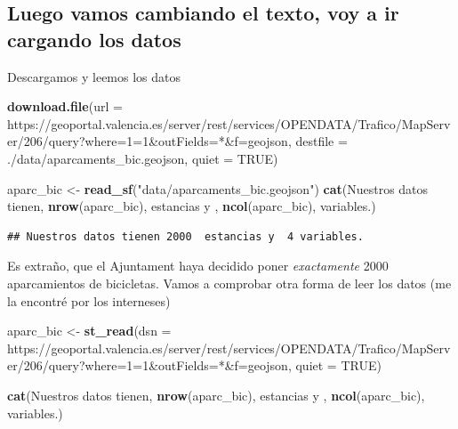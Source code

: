 \documentclass[notspecified,article,submit,moreauthors,pdftex]{Definitions/mdpi}
\newenvironment{Shaded}{\begin{snugshade}}{\end{snugshade}}
\newcommand{\AttributeTok}[1]{\textcolor[rgb]{0.13,0.29,0.53}{#1}}
\newcommand{\ConstantTok}[1]{\textcolor[rgb]{0.56,0.35,0.01}{#1}}
\newcommand{\FunctionTok}[1]{\textcolor[rgb]{0.13,0.29,0.53}{\textbf{#1}}}
\newcommand{\NormalTok}[1]{#1}
\newcommand{\OtherTok}[1]{\textcolor[rgb]{0.56,0.35,0.01}{#1}}
\newcommand{\StringTok}[1]{\textcolor[rgb]{0.31,0.60,0.02}{#1}}
\begin{document}
\subsection{Luego vamos cambiando el texto, voy a ir cargando los
datos}\label{luego-vamos-cambiando-el-texto-voy-a-ir-cargando-los-datos}

Descargamos y leemos los datos

\begin{Shaded}
\begin{Highlighting}[]
\FunctionTok{download.file}\NormalTok{(}\AttributeTok{url =} \StringTok{\textquotesingle{}https://geoportal.valencia.es/server/rest/services/OPENDATA/Trafico/MapServer/206/query?where=1=1\&outFields=*\&f=geojson\textquotesingle{}}\NormalTok{, }\AttributeTok{destfile =} \StringTok{\textquotesingle{}./data/aparcaments\_bic.geojson\textquotesingle{}}\NormalTok{, }\AttributeTok{quiet =} \ConstantTok{TRUE}\NormalTok{)}

\NormalTok{aparc\_bic }\OtherTok{\textless{}{-}} \FunctionTok{read\_sf}\NormalTok{(}\StringTok{"data/aparcaments\_bic.geojson"}\NormalTok{)}
\FunctionTok{cat}\NormalTok{(}\StringTok{\textquotesingle{}Nuestros datos tienen\textquotesingle{}}\NormalTok{, }\FunctionTok{nrow}\NormalTok{(aparc\_bic), }\StringTok{\textquotesingle{} estancias y \textquotesingle{}}\NormalTok{, }\FunctionTok{ncol}\NormalTok{(aparc\_bic), }\StringTok{\textquotesingle{}variables.\textquotesingle{}}\NormalTok{)}
\end{Highlighting}
\end{Shaded}

\begin{verbatim}
## Nuestros datos tienen 2000  estancias y  4 variables.
\end{verbatim}

Es extraño, que el Ajuntament haya decidido poner \emph{exactamente}
2000 aparcamientos de bicicletas. Vamos a comprobar otra forma de leer
los datos (me la encontré por los interneses)

\begin{Shaded}
\begin{Highlighting}[]
\NormalTok{aparc\_bic }\OtherTok{\textless{}{-}} \FunctionTok{st\_read}\NormalTok{(}\AttributeTok{dsn =} \StringTok{\textquotesingle{}https://geoportal.valencia.es/server/rest/services/OPENDATA/Trafico/MapServer/206/query?where=1=1\&outFields=*\&f=geojson\textquotesingle{}}\NormalTok{, }\AttributeTok{quiet =} \ConstantTok{TRUE}\NormalTok{)}

\FunctionTok{cat}\NormalTok{(}\StringTok{\textquotesingle{}Nuestros datos tienen\textquotesingle{}}\NormalTok{, }\FunctionTok{nrow}\NormalTok{(aparc\_bic), }\StringTok{\textquotesingle{} estancias y \textquotesingle{}}\NormalTok{, }\FunctionTok{ncol}\NormalTok{(aparc\_bic), }\StringTok{\textquotesingle{}variables.\textquotesingle{}}\NormalTok{)}
\end{Highlighting}
\end{Shaded}
\end{document}
